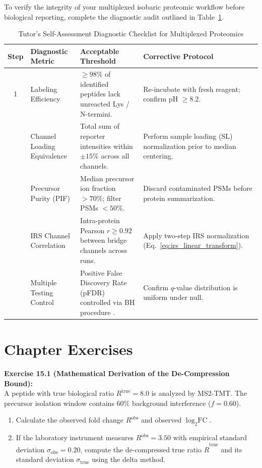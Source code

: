 \documentclass[11pt,oneside]{book}
\begin{document}
To verify the integrity of your multiplexed isobaric proteomic workflow before biological reporting, complete the diagnostic audit outlined in Table~\ref{tab:tmt_checklist}.

\begin{table}[ht]
\centering
\caption{Tutor's Self-Assessment Diagnostic Checklist for Multiplexed Proteomics}
\label{tab:tmt_checklist}
\small
\begin{tabularx}{\textwidth}{c p{4.2cm} p{4.5cm} X}
\toprule
\textbf{Step} & \textbf{Diagnostic Metric} & \textbf{Acceptable Threshold} & \textbf{Corrective Protocol} \\
\midrule
1 & Labeling Efficiency & $\ge 98\%$ of identified peptides lack unreacted Lys / N-termini. & Re-incubate with fresh reagent; confirm pH $\ge 8.2$. \\
\addlinespace
2 & Channel Loading Equivalence & Total sum of reporter intensities within $\pm 15\%$ across all channels. & Perform sample loading (SL) normalization prior to median centering. \\
\addlinespace
3 & Precursor Purity (PIF) & Median precursor ion fraction $> 70\%$; filter PSMs $< 50\%$. & Discard contaminated PSMs before protein summarization. \\
\addlinespace
4 & IRS Channel Correlation & Intra-protein Pearson $r \ge 0.92$ between bridge channels across runs. & Apply two-step IRS normalization (Eq.~\ref{eq:irs_linear_transform}). \\
\addlinespace
5 & Multiple Testing Control & Positive False Discovery Rate (pFDR) controlled via BH procedure \cite{benjamini1995controlling}. & Confirm $q$-value distribution is uniform under null. \\
\bottomrule
\end{tabularx}
\end{table}

\section{Chapter Exercises}

\noindent\textbf{Exercise 15.1 (Mathematical Derivation of the De-Compression Bound):}\\
A peptide with true biological ratio $R^{\text{true}} = 8.0$ is analyzed by MS2-TMT. The precursor isolation window contains $60\%$ background interference ($f = 0.60$).
\begin{enumerate}
    \item Calculate the observed fold change $R^{\text{obs}}$ and observed $\log_2\text{FC}$.
    \item If the laboratory instrument measures $R^{\text{obs}} = 3.50$ with empirical standard deviation $\sigma_{\text{obs}} = 0.20$, compute the de-compressed true ratio $\hat{R}^{\text{true}}$ and its standard deviation $\sigma_{\text{true}}$ using the delta method.
\end{enumerate}
\end{document}
